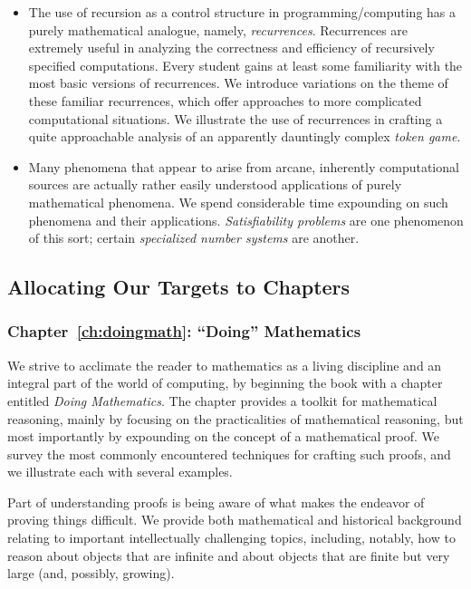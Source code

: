 \begin{enumerate}
\begin{itemize}
\medskip\item
The use of recursion as a control structure in programming/computing has a purely mathematical analogue, namely, {\em recurrences}.  Recurrences are extremely useful in analyzing the correctness and efficiency of recursively specified computations.  Every student gains at least some familiarity with the most basic versions of recurrences.  We introduce variations on the theme of these familiar recurrences, which offer approaches to more complicated computational situations.  We illustrate the use of recurrences in crafting a quite approachable analysis of an apparently dauntingly complex {\em token game}.
\medskip\item
Many phenomena that appear to arise from arcane, inherently computational sources are actually rather easily understood applications of purely mathematical phenomena.  We spend considerable time expounding on such phenomena and their applications.   {\em Satisfiability problems} are one phenomenon of this sort; certain {\em specialized number systems} are another.
\end{itemize}
\end{enumerate}


\subsection{Allocating Our Targets to Chapters}
\label{sec:the chapters}

\subsubsection{Chapter~\ref{ch:doingmath}: ``Doing'' Mathematics}
  
We strive to acclimate the reader to mathematics as a living discipline and an integral part of the world of computing, by beginning the book with a chapter entitled {\it Doing Mathematics}.  The chapter provides a toolkit for mathematical reasoning, mainly by focusing on the practicalities of mathematical reasoning, but most importantly by expounding on the concept of a mathematical proof.  We survey the most commonly encountered techniques for crafting such proofs, and we illustrate each with several examples.

\smallskip

Part of understanding proofs is being aware of what makes the endeavor of proving things difficult.  We provide both mathematical and historical background relating to important intellectually challenging topics, including, notably, how to reason about objects that are infinite and about objects that are finite but very large (and, possibly, growing).

